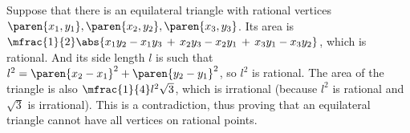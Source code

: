 Suppose that there is an equilateral triangle with rational vertices
$\paren{x_1, y_1}, \paren{x_2, y_2}, \paren{x_3, y_3}$.
Its area is
$\mfrac{1}{2} \abs{x_1 y_2 - x_1 y_3 \, + \, x_2 y_3 - x_2 y_1 \, + \, x_3 y_1 - x_3 y_2}$,
which is rational.
And its side length $l$ is such that
$l^2 = \paren{x_2 - x_1}^2 + \paren{y_2 - y_1}^2$,
so $l^2$ is rational. \newline
The area of the triangle is also $\mfrac{1}{4} l^2 \sqrt{3}$,
which is irrational (because $l^2$ is rational and $\sqrt{3}$ is irrational).
This is a contradiction, thus proving that an equilateral triangle cannot have all vertices on rational points.
